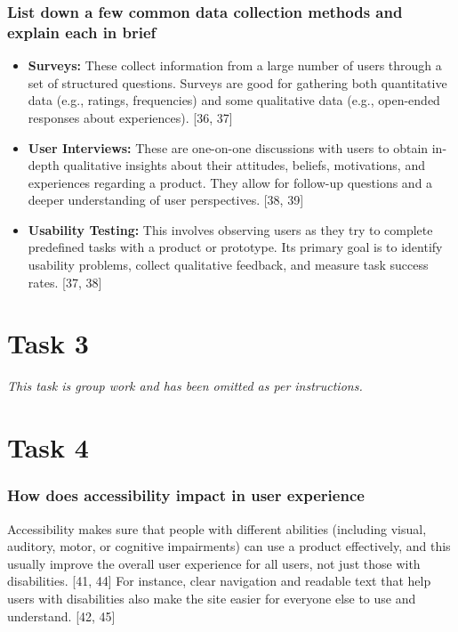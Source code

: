 \documentclass[12pt,a4paper]{article}
\begin{document}
\subsubsection*{List down a few common data collection methods and explain each in brief}
\begin{itemize}
    \item \textbf{Surveys:} These collect information from a large number of users through a set of structured questions. Surveys are good for gathering both quantitative data (e.g., ratings, frequencies) and some qualitative data (e.g., open-ended responses about experiences). [36, 37]
    \item \textbf{User Interviews:} These are one-on-one discussions with users to obtain in-depth qualitative insights about their attitudes, beliefs, motivations, and experiences regarding a product. They allow for follow-up questions and a deeper understanding of user perspectives. [38, 39]
    \item \textbf{Usability Testing:} This involves observing users as they try to complete predefined tasks with a product or prototype. Its primary goal is to identify usability problems, collect qualitative feedback, and measure task success rates. [37, 38]
\end{itemize}

\vspace{1cm}

\section*{Task 3}
\textit{This task is group work and has been omitted as per instructions.}

\vspace{1cm}

\section*{Task 4}

\subsubsection*{How does accessibility impact in user experience}
Accessibility makes sure that people with different abilities (including visual, auditory, motor, or cognitive impairments) can use a product effectively, and this usually improve the overall user experience for all users, not just those with disabilities. [41, 44] For instance, clear navigation and readable text that help users with disabilities also make the site easier for everyone else to use and understand. [42, 45]
\end{document}
